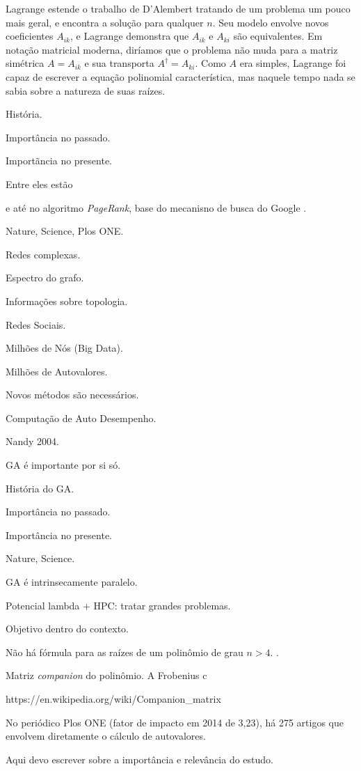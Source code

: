 	Lagrange estende o trabalho de D'Alembert tratando de um problema um pouco mais geral, e encontra a solução para qualquer $n$. Seu modelo envolve novos coeficientes $A_{ik}$, e Lagrange demonstra que $A_{ik}$ e $A_{ki}$ são equivalentes. Em notação matricial moderna, diríamos que o problema não muda para a matriz simétrica $A = {A_{ik}}$ e sua transporta $A^\dag = {A_{ki}}$. Como $A$ era simples, Lagrange foi capaz de escrever a equação polinomial característica, mas naquele tempo nada se sabia sobre a natureza de suas raízes.
	
	

História.

Importância no passado.

Importãncia no presente.

Entre eles estão 
	
	 e até no algoritmo \emph{PageRank}, base do mecanisno de busca do Google \cite{BrinPage98}. 
	
Nature, Science, Plos ONE.

Redes complexas.

Espectro do grafo.

Informações sobre topologia.

Redes Sociais.

Milhões de Nós (Big Data).

Milhões de Autovalores.

Novos métodos são necessários.

Computação de Auto Desempenho.

Nandy 2004.

GA é importante por si só.

História do GA.

Importância no passado.

Importância no presente.

Nature, Science.

GA é intrinsecamente paralelo.

Potencial lambda + HPC: tratar grandes problemas.

Objetivo dentro do contexto.


Não há fórmula para as raízes de um polinômio de grau $n > 4$. \cite{Pan97}.

Matriz \emph{companion} do polinômio. A Frobenius c

https://en.wikipedia.org/wiki/Companion\_matrix

No periódico Plos ONE (fator de impacto em 2014 de 3,23), há 275 artigos que envolvem diretamente o cálculo de autovalores. 

Aqui devo escrever sobre a importância e relevância do estudo. 